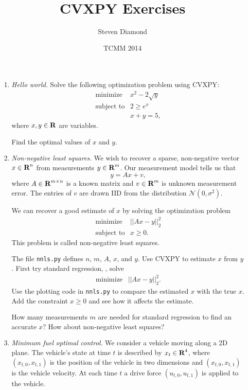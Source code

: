 \documentclass[12pt]{article}
\title{CVXPY Exercises}
\author{Steven Diamond}
\date{TCMM 2014}
\begin{document}
\maketitle

\begin{enumerate}
\item\emph{Hello world.}
Solve the following optimization problem using CVXPY:
\[
\begin{array}{ll} \mbox{minimize} & x^2 - 2\sqrt{y}\\
\mbox{subject to} & 2 \geq e^x \\
& x + y = 5,
\end{array}
\]
where $x,y \in {\mbox{\bf R}}$ are variables.

Find the optimal values of $x$ and $y$.

\item\emph{Non-negative least squares.}
We wish to recover a sparse, non-negative vector $x \in {\mbox{\bf R}}^n$ from measurements $y \in {\mbox{\bf R}}^m$. Our measurement model tells us that
$$
y = Ax + v,
$$
where $A \in {\mbox{\bf R}}^{m \times n}$ is a known matrix and $v \in {\mbox{\bf R}}^m$ is unknown measurement error. The entries of $v$ are drawn IID from the distribution $\mathcal{N}(0, \sigma^2)$.

We can recover a good estimate of $x$ by solving the optimization problem
\[
\begin{array}{ll} \mbox{minimize} & ||Ax - y||^2_2\\
\mbox{subject to} & x \geq 0.
\end{array}
\]
This problem is called non-negative least squares.

The file \verb+nnls.py+ defines $n$, $m$, $A$, $x$, and $y$. Use CVXPY to estimate $x$ from $y$. First try standard regression, \ie, solve
\[
\begin{array}{ll} \mbox{minimize} & ||Ax - y||^2_2.
\end{array}
\]
Use the plotting code in \verb+nnls.py+ to compare the estimated $x$ with the true $x$. Add the constraint $x \geq 0$ and see how it affects the estimate.

How many measurements $m$ are needed for standard regression to find an accurate $x$? How about non-negative least squares?

\item \emph{Minimum fuel optimal control.}
We consider a vehicle moving along a 2D plane. The vehicle's state at time $t$ is described by $x_t \in {\mbox{\bf R}}^4$, where $(x_{t,0}, x_{t,1})$ is the position of the vehicle in two dimensions and $(x_{t,0}, x_{t,1})$ is the vehicle velocity. At each time $t$ a drive force $(u_{t,0}, u_{t,1})$ is applied to the vehicle.


\end{enumerate}
\end{document}
